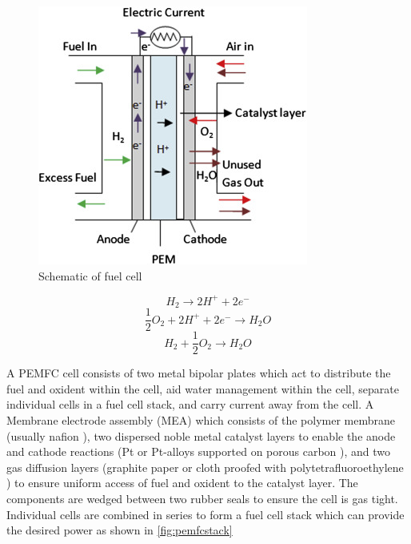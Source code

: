 \begin{figure}[H]
    \centering
    \includegraphics{figures/pemfccell.jpg}
    \caption{Schematic of fuel cell \cite{Dharmalingam2019}}
    \label{fig:pemfccell}
\end{figure}

\begin{equation} \label{pemfcanode}
    H_2 \rightarrow 2H^+ + 2e^-
\end{equation}
\begin{equation} \label{pemfccathode}
    \frac{1}{2}O_2 + 2H^+ + 2e^- \rightarrow H_2 O
\end{equation}
\begin{equation} \label{pemfcall}
    H_2 + \frac{1}{2}O_2 \rightarrow H_2O
\end{equation}


 A PEMFC cell consists of two metal bipolar plates which act to distribute the fuel and oxident within the cell, aid water management within the cell, separate individual cells in a fuel cell stack, and carry current away from the cell. \cite{Alaswad2016} A Membrane electrode assembly (MEA) which consists of the polymer membrane (usually nafion \cite{Mehta2003}), two dispersed noble metal catalyst layers to enable the anode and cathode reactions (Pt or Pt-alloys supported on porous carbon \cite{Mehta2003}), and two gas diffusion layers (graphite paper or cloth proofed with polytetrafluoroethylene \cite{Mehta2003}) to ensure uniform access of fuel and oxident to the catalyst layer. The components are wedged between two rubber seals to ensure the cell is gas tight. Individual cells are combined in series to form a fuel cell stack which can provide the desired power as shown in \ref{fig:pemfcstack}

